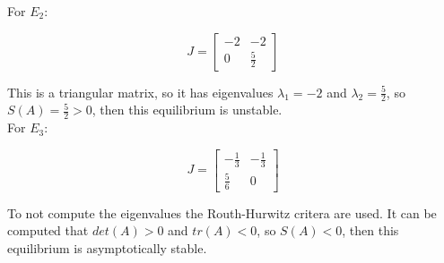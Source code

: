   For $E_2$:

  $$J = \begin{bmatrix} -2 & -2\\ 0 & \frac{5}{2}\end{bmatrix}$$

  This is a triangular matrix, so it has eigenvalues $\lambda_1 = -2$ and $\lambda_2 = \frac{5}{2}$, so $S(A) = \frac{5}{2} > 0$, then this equilibrium is unstable.\\

  For $E_3$:

  $$J=\begin{bmatrix} -\frac{1}{3} & -\frac{1}{3}\\ \frac{5}{6} & 0\end{bmatrix}$$

  To not compute the eigenvalues the Routh-Hurwitz critera are used.
  It can be computed that $det(A) > 0$ and $tr(A) < 0$, so $S(A) < 0$, then this equilibrium is asymptotically stable.





